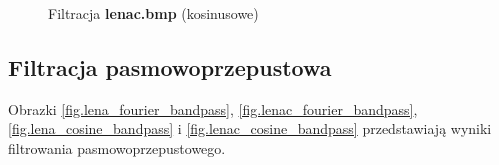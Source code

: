 \documentclass{classrep}
\begin{document}
\begin{figure}
{  \label{fig.lenac_cosine_highpass_0_5}
 }
\caption{Filtracja \textbf{lenac.bmp} (kosinusowe)}
\label{fig.lenac_cosine_highpass}
\end{figure}

\subsection{Filtracja pasmowoprzepustowa}
Obrazki \ref{fig.lena_fourier_bandpass}, \ref{fig.lenac_fourier_bandpass}, \ref{fig.lena_cosine_bandpass} i \ref{fig.lenac_cosine_bandpass} przedstawiają wyniki filtrowania pasmowoprzepustowego.
\end{document}
